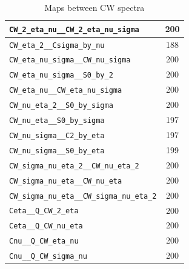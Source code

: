 \begin{table}
\begin{tabular}{|l|c|}
\texttt{CW\_2\_eta\_nu\_\_CW\_2\_eta\_nu\_sigma} & 200\\\hline
\texttt{CW\_eta\_2\_\_Csigma\_by\_nu} & 188\\\hline
\texttt{CW\_eta\_nu\_sigma\_\_CW\_nu\_sigma} & 200\\\hline
\texttt{CW\_eta\_nu\_sigma\_\_S0\_by\_2} & 200\\\hline
\texttt{CW\_eta\_nu\_\_CW\_eta\_nu\_sigma} & 200\\\hline
\texttt{CW\_nu\_eta\_2\_\_S0\_by\_sigma} & 200\\\hline
\texttt{CW\_nu\_eta\_\_S0\_by\_sigma} & 197\\\hline
\texttt{CW\_nu\_sigma\_\_C2\_by\_eta} & 197\\\hline
\texttt{CW\_nu\_sigma\_\_S0\_by\_eta} & 199\\\hline
\texttt{CW\_sigma\_nu\_eta\_2\_\_CW\_nu\_eta\_2} & 200\\\hline
\texttt{CW\_sigma\_nu\_eta\_\_CW\_nu\_eta} & 200\\\hline
\texttt{CW\_sigma\_nu\_eta\_\_CW\_sigma\_nu\_eta\_2} & 200\\\hline
\texttt{Ceta\_\_Q\_CW\_2\_eta} & 200\\\hline
\texttt{Ceta\_\_Q\_CW\_nu\_eta} & 200\\\hline
\texttt{Cnu\_\_Q\_CW\_eta\_nu} & 200\\\hline
\texttt{Cnu\_\_Q\_CW\_sigma\_nu} & 200\\\hline
\end{tabular}\caption{Maps between CW spectra}\label{tb:map1}
\end{table}

